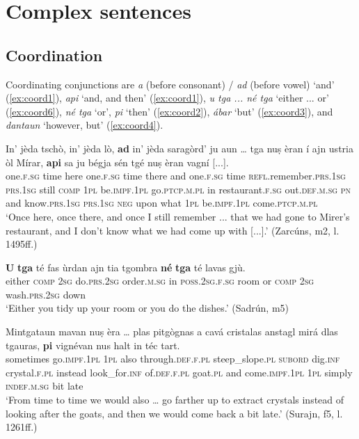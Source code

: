 \chapter{Complex sentences}

\section{Coordination}
Coordinating conjunctions are \textit{a} (before consonant) / \textit{ad} (before vowel) `and' (\ref{ex:coord1}), \textit{api} `and, and then' (\ref{ex:coord1}), \textit{u tga ... né tga} `either ... or' (\ref{ex:coord6}),  \textit{né tga} `or', \textit{pi} `then' (\ref{ex:coord2}), \textit{ábar} `but' (\ref{ex:coord3}), and \textit{dantaun} `however, but' (\ref{ex:coord4}).

\ea
\label{ex:coord1}
\gll    In’ jèda tschò, in’ jèda lò, \textbf{ad} in’ jèda saragòrd’ ju aun … tga nuṣ èran í ajn ustria òl Mírar, \textbf{api} sa ju bégja sén tgé nuṣ èran vagní [...].\\
one.\textsc{f.sg} time here one.\textsc{f.sg} time there and one.\textsc{f.sg} time \textsc{refl}.remember.\textsc{prs.1sg} \textsc{prs.1sg} still {}  \textsc{comp} \textsc{1pl} be.\textsc{impf.1pl} go.\textsc{ptcp.m.pl} in restaurant.\textsc{f.sg} out.\textsc{def.m.sg} \textsc{pn} and  know.\textsc{prs.1sg} \textsc{prs.1sg} \textsc{neg} upon what \textsc{1pl} be.\textsc{impf.1pl} come.\textsc{ptcp.m.pl}\\
\glt `Once here, once there, and once I still remember ... that we had gone to Mirer's restaurant, and I don't know what we had come up with [...].' (Zarcúns, m2, l. 1495ff.)
\z

\ea
\label{ex:coord6}
\gll \textbf{U} \textbf{tga} té fas ùrdan ajn tia tgombra \textbf{né} \textbf{tga} té lavas gjù.\\
either \textsc{comp} \textsc{2sg} do.\textsc{prs.2sg} order.\textsc{m.sg} in \textsc{poss.2sg.f.sg} room or \textsc{comp} \textsc{2sg} wash.\textsc{prs.2sg} down\\
\glt`Either you tidy up your room or you do the dishes.' (Sadrún, m5)
\z

\ea
\label{ex:coord2}
\gll    Mintgataun mavan nuṣ èra … plas pitgògnas a cavá cristalas anstagl mirá dlas tgauras, \textbf{pi} vignévan nus halt in téc tart. \\
sometimes go.\textsc{impf.1pl} \textsc{1pl} also {} through.\textsc{def.f.pl} steep\_slope.\textsc{pl} \textsc{subord} dig.\textsc{inf} crystal.\textsc{f.pl} instead look\_for.\textsc{inf} of.\textsc{def.f.pl} goat.\textsc{pl} and come.\textsc{impf.1pl} \textsc{1pl} simply \textsc{indef.m.sg} bit late \\
\glt `From time to time we would also … go farther up to extract crystals instead of looking after the goats, and then we would come back a bit late.' (Surajn, f5, l. 1261ff.)
\z

